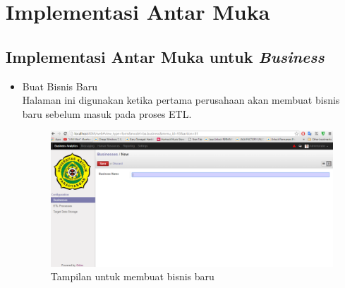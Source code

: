 	\section{Implementasi Antar Muka}
	\subsection{Implementasi Antar Muka untuk \textit{Business}}
	\begin{itemize}
		\item Buat Bisnis Baru\\
		Halaman ini digunakan ketika pertama perusahaan akan membuat bisnis baru sebelum masuk pada proses ETL.
		\begin{figure}[H]
		\centering
		\includegraphics[scale=0.4]{Gambar/tampilan-business}
		\caption{Tampilan untuk membuat bisnis baru}
		\end{figure}
	\end{itemize}
	
